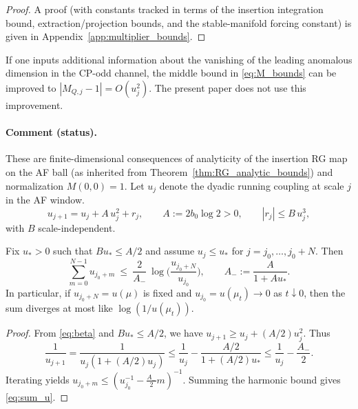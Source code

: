 \begin{proof}
A proof (with constants tracked in terms of the insertion integration bound, extraction/projection bounds, and the stable-manifold forcing constant)
is given in Appendix~\ref{app:multiplier_bounds}.
\end{proof}

\begin{remark}
If one inputs additional information about the vanishing of the leading anomalous dimension in the CP-odd channel,
the middle bound in \eqref{eq:M_bounds} can be improved to $|M_{Q,j}-1|=O(u_j^2)$.
The present paper does not use this improvement.
\end{remark}


\paragraph{Comment (status).}
These are finite-dimensional consequences of analyticity of the insertion RG map on the AF ball (as inherited from Theorem~\ref{thm:RG_analytic_bounds}) and normalization $M(0,0)=1$.
Let $u_j$ denote the dyadic running coupling at scale $j$ in the AF window.
\begin{equation}\label{eq:beta}
u_{j+1}=u_j + A\,u_j^2 + r_j,\qquad A:=2b_0\log 2>0,\qquad |r_j|\le B\,u_j^3,
\end{equation}
with $B$ scale-independent.

\begin{lemma}\label{lem:sum_u}
Fix $u_\ast>0$ such that $B u_\ast\le A/2$ and assume $u_j\le u_\ast$ for $j=j_0,\dots,j_0+N$.
Then
\begin{equation}\label{eq:sum_u}
\sum_{m=0}^{N-1} u_{j_0+m}
\ \le\ \frac{2}{A_-}\ \log\Big(\frac{u_{j_0+N}}{u_{j_0}}\Big),
\qquad
A_-:=\frac{A}{1+A u_\ast}.
\end{equation}
In particular, if $u_{j_0+N}=u(\mu)$ is fixed and $u_{j_0}=u(\mu_t)\to 0$ as $t\downarrow 0$, then the sum diverges at most like $\log(1/u(\mu_t))$.
\end{lemma}

\begin{proof}
From \eqref{eq:beta} and $B u_\ast\le A/2$, we have $u_{j+1}\ge u_j + (A/2)u_j^2$.
Thus
\[
\frac{1}{u_{j+1}}=\frac{1}{u_j(1+(A/2)u_j)}\le \frac{1}{u_j}-\frac{A/2}{1+(A/2)u_\ast}\le \frac{1}{u_j}-\frac{A_-}{2}.
\]
Iterating yields $u_{j_0+m}\le (u_{j_0}^{-1}-\tfrac{A_-}{2}m)^{-1}$. Summing the harmonic bound gives \eqref{eq:sum_u}.
\end{proof}

